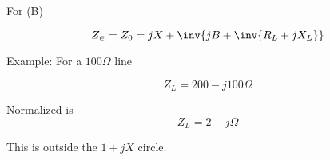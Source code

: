 For (B) 

\begin{equation}\label{eqn:uwavesDeck6LCmatchingCore:n}
Z_\in = Z_0 = j X + \inv{ j B + \inv{R_L + j X_L} }
\end{equation}

Example: For a \( 100 \Omega \) line

\begin{equation}\label{eqn:uwavesDeck6LCmatchingCore:n}
Z_L = 200 -j 100 \Omega 
\end{equation}

Normalized is
\begin{equation}\label{eqn:uwavesDeck6LCmatchingCore:n}
Z_L = 2 -j \Omega 
\end{equation}

This is outside the \( 1 + j X \) circle.



